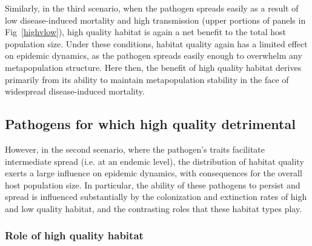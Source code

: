 \documentclass{article}
\begin{document}
Similarly, in the third scenario, when the pathogen spreads easily as a result of low disease-induced mortality and high transmission (upper portions of panels in Fig~\ref{highvlow}), high quality habitat is again a net benefit to the total host population size.  
Under these conditions, habitat quality again has a limited effect on epidemic dynamics, as the pathogen spreads easily enough to overwhelm any metapopulation structure.
Here then, the benefit of high quality habitat derives primarily from its ability to maintain metapopulation stability in the face of widespread disease-induced mortality.

\subsection*{Pathogens for which high quality detrimental}

However, in the second scenario, where the pathogen's traits facilitate intermediate spread (i.e. at an endemic level), the distribution of habitat quality exerts a large influence on epidemic dynamics, with consequences for the overall host population size.
In particular, the ability of these pathogens to persist and spread is influenced substantially by the colonization and extinction rates of high and low quality habitat, and the contrasting roles that these habitat types play.
 

\subsubsection*{Role of high quality habitat}
\end{document}
